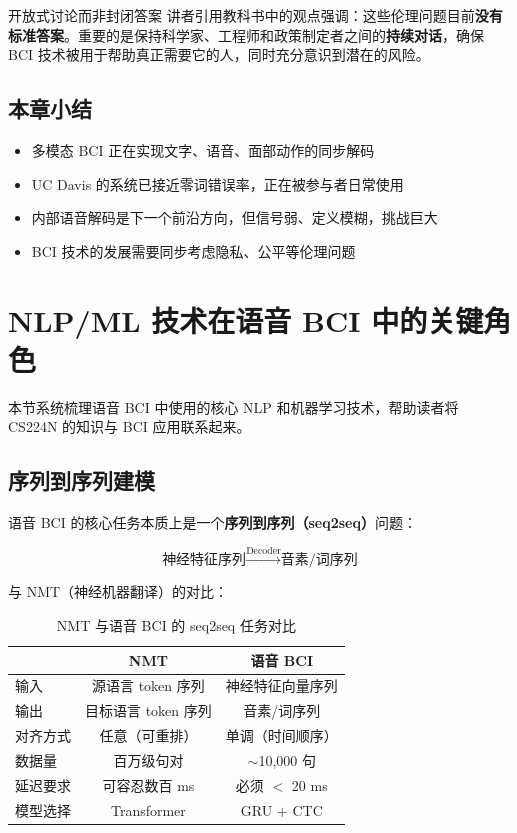 \documentclass[a4paper]{article}
\begin{document}
\begin{knowledgebox}{开放式讨论而非封闭答案}
讲者引用教科书中的观点强调：这些伦理问题目前\textbf{没有标准答案}。重要的是保持科学家、工程师和政策制定者之间的\textbf{持续对话}，确保 BCI 技术被用于帮助真正需要它的人，同时充分意识到潜在的风险。
\end{knowledgebox}

\subsection{本章小结}

\begin{itemize}
    \item 多模态 BCI 正在实现文字、语音、面部动作的同步解码
    \item UC Davis 的系统已接近零词错误率，正在被参与者日常使用
    \item 内部语音解码是下一个前沿方向，但信号弱、定义模糊，挑战巨大
    \item BCI 技术的发展需要同步考虑隐私、公平等伦理问题
\end{itemize}


\section{NLP/ML 技术在语音 BCI 中的关键角色}

本节系统梳理语音 BCI 中使用的核心 NLP 和机器学习技术，帮助读者将 CS224N 的知识与 BCI 应用联系起来。

\subsection{序列到序列建模}

语音 BCI 的核心任务本质上是一个\textbf{序列到序列（seq2seq）}问题：

$$\text{神经特征序列} \xrightarrow{\text{Decoder}} \text{音素/词序列}$$

与 NMT（神经机器翻译）的对比：

\begin{table}[H]
\centering
\begin{tabular}{lcc}
\toprule
& \textbf{NMT} & \textbf{语音 BCI} \\
\midrule
输入 & 源语言 token 序列 & 神经特征向量序列 \\
输出 & 目标语言 token 序列 & 音素/词序列 \\
对齐方式 & 任意（可重排） & 单调（时间顺序） \\
数据量 & 百万级句对 & $\sim$10,000 句 \\
延迟要求 & 可容忍数百 ms & 必须 $<$ 20 ms \\
模型选择 & Transformer & GRU + CTC \\
\bottomrule
\end{tabular}
\caption{NMT 与语音 BCI 的 seq2seq 任务对比}
\end{table}
\end{document}
